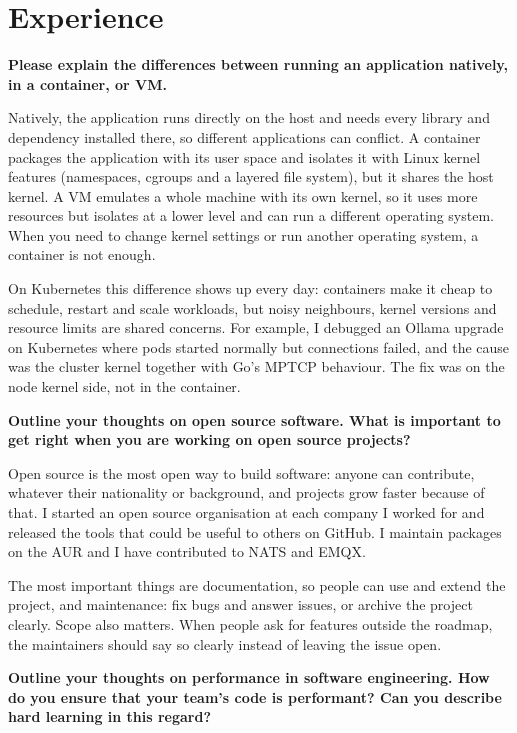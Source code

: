 \section{Experience}

\noindent
\textbf{Please explain the differences between running an application natively, in a container, or VM.}

Natively, the application runs directly on the host and needs every library and dependency installed there, so different applications can conflict.
A container packages the application with its user space and isolates it with Linux kernel features (namespaces, cgroups and a layered file system),
but it shares the host kernel. A VM emulates a whole machine with its own kernel, so it uses more resources but isolates at a lower level and can run
a different operating system. When you need to change kernel settings or run another operating system, a container is not enough.

On Kubernetes this difference shows up every day: containers make it cheap to schedule, restart and scale workloads, but noisy neighbours, kernel
versions and resource limits are shared concerns. For example, I debugged an Ollama upgrade on Kubernetes where pods started normally but connections
failed, and the cause was the cluster kernel together with Go's MPTCP behaviour. The fix was on the node kernel side, not in the container.

\noindent
\textbf{Outline your thoughts on open source software.
What is important to get right when you are working on open source projects?}

Open source is the most open way to build software: anyone can contribute, whatever their nationality or background, and projects grow faster because
of that. I started an open source organisation at each company I worked for and released the tools that could be useful to others on GitHub. I maintain
packages on the AUR and I have contributed to NATS and EMQX.

The most important things are documentation, so people can use and extend the project, and maintenance: fix bugs and answer issues, or archive the
project clearly. Scope also matters. When people ask for features outside the roadmap, the maintainers should say so clearly instead of leaving the
issue open.

\noindent
\textbf{Outline your thoughts on performance in software engineering. How do you ensure that your team's code is performant?
Can you describe hard learning in this regard?}

